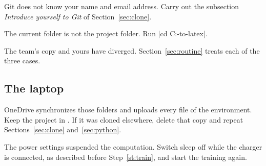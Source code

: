 \cause Git does not know your name and email address.
\remedy Carry out the subsection \emph{Introduce yourself to Git} of Section~\ref{sec:clone}.

\cause The current folder is not the project folder.
\remedy Run \code|cd C:\camera-to-latex|.

\cause The team's copy and yours have diverged.
\remedy Section~\ref{sec:routine} treats each of the three cases.

\subsection{The laptop}

\cause OneDrive synchronizes those folders and uploads every file of the environment.
\remedy Keep the project in . If it was cloned elsewhere, delete that copy and
repeat Sections~\ref{sec:clone} and~\ref{sec:python}.

\cause The power settings suspended the computation.
\remedy Switch sleep off while the charger is connected, as described before Step~\ref{st:train}, and
start the training again.
